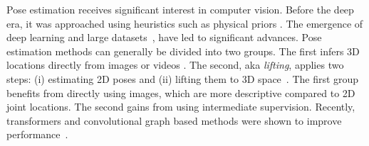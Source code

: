
\label{sec:related}

Pose estimation receives significant interest in computer vision. Before the deep era, it was approached using heuristics such as physical priors \cite{Sarafianos_2016}. %
The emergence of deep learning and large datasets~\cite{h36m_pami,CMU:mocap,3DPWvonMarcard2018,footballDS}, have led to significant advances. 
Pose estimation methods can generally be divided into two groups. The first  infers 3D locations directly from images or videos \cite{firstSingleViewCNN,Pavlakos_coarse_to_fine,zhu2020nbaplayers,tekin2016structured,sun2018integral,cheng20203d,habibie2019wild}. 
The second, aka \emph{lifting}, applies two steps: (i) estimating 2D poses and (ii) lifting them to 3D space~\cite{martinez2017simple,pavllo20193d,fang2018learning,sym12071116,liu2019improving,Hossain_2018,Shan2021ImprovingRA}.  
The first group benefits from directly using images, which are more descriptive compared to 2D joint locations. The second gains from using intermediate supervision.
%
%
Recently, transformers and convolutional graph based methods were shown to improve performance~\cite{llopart2020liftformer,lin2020endtoend,liu2020attention,li2021exploiting,wang2020motion,hu2021conditional,Human_Mesh_Recovery_from_Multiple_Shots}.

